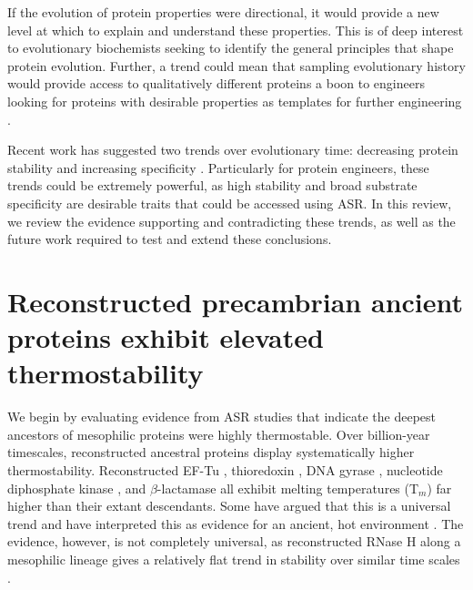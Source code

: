 If the evolution of protein properties were directional, it would
provide a new level at which to explain and understand these properties.
This is of deep interest to evolutionary biochemists seeking to identify
the general principles that shape protein evolution. Further, a trend
could mean that sampling evolutionary history would provide access
to qualitatively different proteins \cite{risso_thermostable_2014}
\textemdash{} a boon to engineers looking for proteins with desirable
properties as templates for further engineering \cite{cole_utilizing_2011,whitfield_construction_2015}.

Recent work has suggested two trends over evolutionary time: decreasing
protein stability \cite{gaucher_palaeotemperature_2008} and increasing
specificity \cite{risso_hyperstability_2013}. Particularly for protein
engineers, these trends could be extremely powerful, as high stability
and broad substrate specificity are desirable traits that could be
accessed using ASR. In this review, we review the evidence supporting
and contradicting these trends, as well as the future work required
to test and extend these conclusions.

\section[Reconstructed Precambrian Ancient Proteins]{Reconstructed precambrian ancient proteins exhibit elevated thermostability}

We begin by evaluating evidence from ASR studies that indicate the
deepest ancestors of mesophilic proteins were highly thermostable.
Over billion-year timescales, reconstructed ancestral proteins display
systematically higher thermostability. Reconstructed EF-Tu \cite{gaucher_palaeotemperature_2008},
thioredoxin \cite{perez-jimenez_single-molecule_2011}, DNA gyrase
\cite{akanuma_phylogeny-based_2011}, nucleotide diphosphate kinase
\cite{akanuma_experimental_2013}, and $\beta$-lactamase \cite{risso_hyperstability_2013}
all exhibit melting temperatures (T$_{m}$) far higher than their
extant descendants. Some have argued that this is a universal trend
\cite{risso_thermostable_2014} and have interpreted this as evidence
for an ancient, hot environment \cite{gaucher_palaeotemperature_2008}.
The evidence, however, is not completely universal, as reconstructed
RNase H along a mesophilic lineage gives a relatively flat trend in
stability over similar time scales \cite{hart_thermodynamic_2014}.

